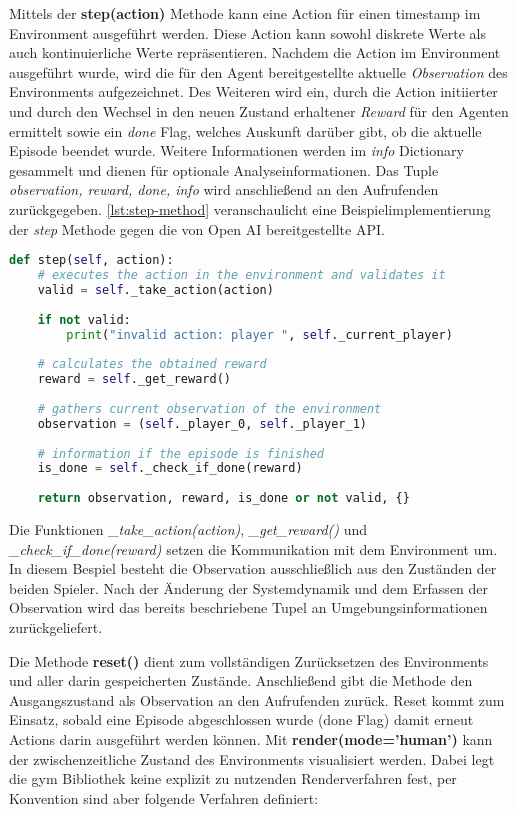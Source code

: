 \documentclass[11pt]{scrartcl}
\begin{document}
Mittels der \textbf{step(action)} Methode kann eine Action für einen timestamp im
Environment ausgeführt werden. Diese Action kann sowohl diskrete Werte als auch 
kontinuierliche Werte repräsentieren. Nachdem die Action im Environment ausgeführt wurde,
wird die für den Agent bereitgestellte aktuelle \textit{Observation} des Environments
aufgezeichnet. Des Weiteren wird ein, durch die Action initiierter und durch den Wechsel
in den neuen Zustand erhaltener \textit{Reward} für den Agenten ermittelt sowie ein 
\textit{done} Flag, welches Auskunft darüber gibt, ob die aktuelle Episode beendet wurde.
Weitere Informationen werden im \textit{info} Dictionary gesammelt und dienen für optionale
Analyseinformationen. Das Tuple \textit{observation, reward, done, info} wird anschließend
an den Aufrufenden zurückgegeben. \autoref{lst:step-method} veranschaulicht eine
Beispielimplementierung der \textit{step} Methode gegen die von Open AI bereitgestellte API.

\begin{lstlisting}[language=Python, caption=step method, label=lst:step-method]
def step(self, action):
	# executes the action in the environment and validates it
	valid = self._take_action(action)
	
	if not valid:
		print("invalid action: player ", self._current_player)
	
	# calculates the obtained reward
	reward = self._get_reward()
	
	# gathers current observation of the environment
	observation = (self._player_0, self._player_1)
	
	# information if the episode is finished
	is_done = self._check_if_done(reward)
    
	return observation, reward, is_done or not valid, {}
\end{lstlisting}
\noindent
Die Funktionen \textit{\_take\_action(action)}, \textit{\_get\_reward()} und
\textit{\_check\_if\_done(reward)} setzen die Kommunikation mit dem Environment um. In
diesem Bespiel besteht die Observation ausschließlich aus den Zuständen der beiden Spieler.
Nach der Änderung der Systemdynamik und dem Erfassen der Observation wird das bereits
beschriebene Tupel an Umgebungsinformationen zurückgeliefert.

Die Methode \textbf{reset()} dient zum vollständigen Zurücksetzen des Environments und aller
darin gespeicherten Zustände. Anschließend gibt die Methode den Ausgangszustand als Observation
an den Aufrufenden zurück. Reset kommt zum Einsatz, sobald eine Episode abgeschlossen wurde
(done Flag) damit erneut Actions darin ausgeführt werden können.
\newline
\noindent
Mit \textbf{render(mode='human')} kann der zwischenzeitliche Zustand des Environments
visualisiert werden. Dabei legt die gym Bibliothek keine explizit zu nutzenden Renderverfahren
fest, per Konvention sind aber folgende Verfahren definiert: 
\end{document}
